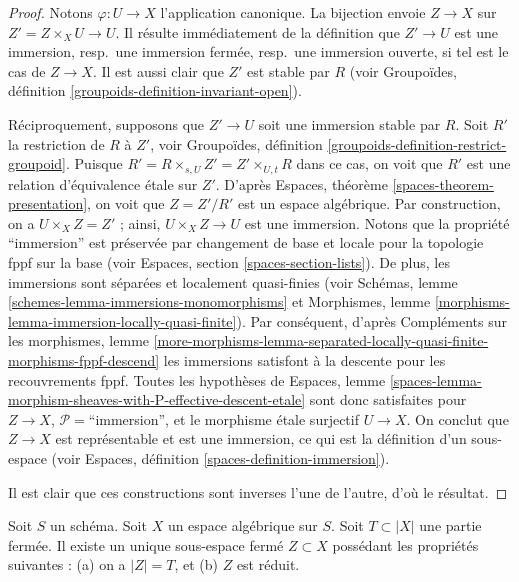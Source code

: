 \begin{proof}
Notons $\varphi : U \to X$ l'application canonique. La bijection envoie
$Z \to X$ sur $Z' = Z \times_X U \to U$. Il résulte immédiatement de la définition
que $Z' \to U$ est une immersion, resp.\ une immersion fermée, resp.\ une
immersion ouverte, si tel est le cas de $Z \to X$. Il est aussi clair que $Z'$ est stable par $R$
(voir Groupoïdes, définition \ref{groupoids-definition-invariant-open}).

\medskip\noindent
Réciproquement, supposons que $Z' \to U$ soit une immersion stable par $R$.
Soit $R'$ la restriction de $R$ à $Z'$, voir
Groupoïdes, définition \ref{groupoids-definition-restrict-groupoid}.
Puisque $R' = R \times_{s, U} Z' = Z' \times_{U, t} R$ dans ce cas,
on voit que $R'$ est une relation d'équivalence \'etale sur $Z'$. D'après
Espaces, théorème \ref{spaces-theorem-presentation}, on voit que
$Z = Z'/R'$ est un espace algébrique. Par construction, on a
$U \times_X Z = Z'$ ; ainsi, $U \times_X Z \to U$ est une immersion.
Notons que la propriété ``immersion'' est préservée par changement de base
et locale pour la topologie fppf sur la base (voir Espaces, section \ref{spaces-section-lists}).
De plus, les immersions sont séparées et localement quasi-finies (voir
Schémas, lemme \ref{schemes-lemma-immersions-monomorphisms}
et
Morphismes, lemme \ref{morphisms-lemma-immersion-locally-quasi-finite}).
Par conséquent, d'après Compléments sur les morphismes, lemme
\ref{more-morphisms-lemma-separated-locally-quasi-finite-morphisms-fppf-descend}
les immersions satisfont à la descente pour les recouvrements fppf. Toutes les hypothèses de
Espaces,
lemme \ref{spaces-lemma-morphism-sheaves-with-P-effective-descent-etale}
sont donc satisfaites pour $Z \to X$, $\mathcal{P}=$``immersion'',
et le morphisme \'etale surjectif $U \to X$. On conclut que $Z \to X$
est représentable et est une immersion, ce qui est la
définition d'un sous-espace (voir
Espaces, définition \ref{spaces-definition-immersion}).

\medskip\noindent
Il est clair que ces constructions sont inverses l'une de l'autre, d'où le résultat.
\end{proof}

\begin{lemma}
\label{lemma-reduced-closed-subspace}
Soit $S$ un schéma.
Soit $X$ un espace algébrique sur $S$.
Soit $T \subset |X|$ une partie fermée.
Il existe un unique sous-espace fermé $Z \subset X$ possédant
les propriétés suivantes : (a) on a $|Z| = T$, et (b) $Z$ est réduit.
\end{lemma}

